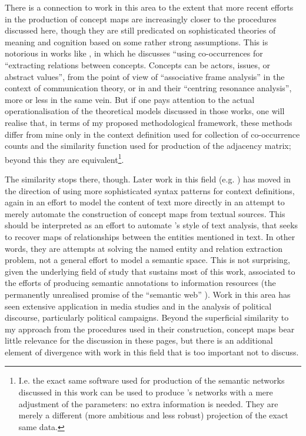 There is a connection to work in this area to the extent that more recent efforts in the production of concept maps are increasingly closer to the procedures discussed here, though they are still predicated on sophisticated theories of meaning and cognition based on some rather strong assumptions.
This is notorious in works like \citet[ch. 5]{vanatteveldt2008}, in which he discusses ``using co-occurrences for ``extracting relations between concepts. Concepts can be actors, issues, or abstract values'', from the point of view of ``associative frame analysis'' \citep{tversky1977,druckman2004} in the context of communication theory, or in \citet{corman2002} and their ``centring resonance analysis'', more or less in the same vein.
But if one pays attention to the actual operationalisation of the theoretical models discussed in those works, one will realise that, in terms of my proposed methodological framework, these methods differ from mine only in the context definition used for collection of co-occurrence counts and the similarity function used for production of the adjacency matrix; beyond this they are equivalent\footnote{
    I.e. the exact same software used for production of the semantic networks discussed in this work can be used to produce \citeauthor{vanatteveldt2008}'s networks with a mere adjustment of the parameters: no extra information is needed.
    They are merely a different (more ambitious and less robust) projection of the exact same data.
}.

The similarity stops there, though.
Later work in this field (e.g. \citet{vanatteveldt2008a}) has moved in the direction of using more sophisticated syntax patterns for context definitions, again in an effort to model the content of text more directly in an attempt to merely automate the construction of concept maps from textual sources.
This should be interpreted as an effort to automate \citeauthor{franzosi2009}'s style of text analysis, that seeks to recover maps of relationships between the entities mentioned in text.
In other words, they are attempts at solving the named entity and relation extraction problem, not a general effort to model a semantic space.
This is not surprising, given the underlying field of study that sustains most of this work, associated to the efforts of producing semantic annotations to information resources (the permanently unrealised promise of the ``semantic web'' \citep{berners-lee2001,shadbolt2006}).
Work in this area has seen extensive application in media studies and in the analysis of political discourse, particularly political campaigns.
Beyond the superficial similarity to my approach from the procedures used in their construction, concept maps bear little relevance for the discussion in these pages, but there is an additional element of divergence with work in this field that is too important not to discuss.

